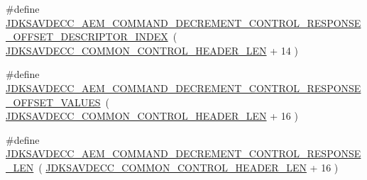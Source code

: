 \begin{DoxyCompactItemize}
\item 
\#define \hyperlink{group__command__decrement__control__response_ga144521c3e88ffe93d0c3a801a0ee817c}{J\+D\+K\+S\+A\+V\+D\+E\+C\+C\+\_\+\+A\+E\+M\+\_\+\+C\+O\+M\+M\+A\+N\+D\+\_\+\+D\+E\+C\+R\+E\+M\+E\+N\+T\+\_\+\+C\+O\+N\+T\+R\+O\+L\+\_\+\+R\+E\+S\+P\+O\+N\+S\+E\+\_\+\+O\+F\+F\+S\+E\+T\+\_\+\+D\+E\+S\+C\+R\+I\+P\+T\+O\+R\+\_\+\+I\+N\+D\+EX}~( \hyperlink{group__jdksavdecc__avtp__common__control__header_gaae84052886fb1bb42f3bc5f85b741dff}{J\+D\+K\+S\+A\+V\+D\+E\+C\+C\+\_\+\+C\+O\+M\+M\+O\+N\+\_\+\+C\+O\+N\+T\+R\+O\+L\+\_\+\+H\+E\+A\+D\+E\+R\+\_\+\+L\+EN} + 14 )
\item 
\#define \hyperlink{group__command__decrement__control__response_gaff0584c207776052a2e23a3ecd9f985e}{J\+D\+K\+S\+A\+V\+D\+E\+C\+C\+\_\+\+A\+E\+M\+\_\+\+C\+O\+M\+M\+A\+N\+D\+\_\+\+D\+E\+C\+R\+E\+M\+E\+N\+T\+\_\+\+C\+O\+N\+T\+R\+O\+L\+\_\+\+R\+E\+S\+P\+O\+N\+S\+E\+\_\+\+O\+F\+F\+S\+E\+T\+\_\+\+V\+A\+L\+U\+ES}~( \hyperlink{group__jdksavdecc__avtp__common__control__header_gaae84052886fb1bb42f3bc5f85b741dff}{J\+D\+K\+S\+A\+V\+D\+E\+C\+C\+\_\+\+C\+O\+M\+M\+O\+N\+\_\+\+C\+O\+N\+T\+R\+O\+L\+\_\+\+H\+E\+A\+D\+E\+R\+\_\+\+L\+EN} + 16 )
\item 
\#define \hyperlink{group__command__decrement__control__response_ga8c51e7251eac6482b81cad179d575ebe}{J\+D\+K\+S\+A\+V\+D\+E\+C\+C\+\_\+\+A\+E\+M\+\_\+\+C\+O\+M\+M\+A\+N\+D\+\_\+\+D\+E\+C\+R\+E\+M\+E\+N\+T\+\_\+\+C\+O\+N\+T\+R\+O\+L\+\_\+\+R\+E\+S\+P\+O\+N\+S\+E\+\_\+\+L\+EN}~( \hyperlink{group__jdksavdecc__avtp__common__control__header_gaae84052886fb1bb42f3bc5f85b741dff}{J\+D\+K\+S\+A\+V\+D\+E\+C\+C\+\_\+\+C\+O\+M\+M\+O\+N\+\_\+\+C\+O\+N\+T\+R\+O\+L\+\_\+\+H\+E\+A\+D\+E\+R\+\_\+\+L\+EN} + 16 )
\end{DoxyCompactItemize}
